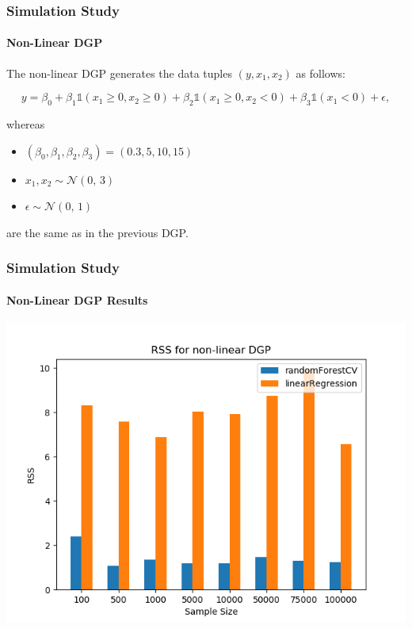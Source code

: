 \begin{frame}
    \frametitle{Simulation Study}
    \framesubtitle{Non-Linear DGP}
    The non-linear DGP generates the data tuples \( (y, x_{1}, x_{2}) \) as follows:

    \begin{equation*}\label{eq:non_linear_dgp}
        y = \beta_{0} + \beta_{1} \mathds{1}(x_{1} \geq 0, x_{2} \geq 0) + \beta_{2} \mathds{1}(x_{1} \geq 0, x_{2} < 0) + \beta_{3} \mathds{1}(x_{1} < 0) + \epsilon,
    \end{equation*}
    
    whereas
    \begin{itemize}
        \item $ (\beta_{0}, \beta_{1}, \beta_{2}, \beta_{3} ) = (0.3, 5, 10, 15)$
        \item $x_{1}, x_{2} \sim \mathcal{N}(0,\,3)$
        \item $\epsilon \sim \mathcal{N}(0,\,1)$
    \end{itemize}
    are the same as in the previous DGP.
\end{frame}

\begin{frame}
    \frametitle{Simulation Study}
    \framesubtitle{Non-Linear DGP Results}
	\begin{center}		
		\includegraphics[height=0.7\textheight]{images/forest_vs_ols_nonlinearDGP.png}
	\end{center}
\end{frame}